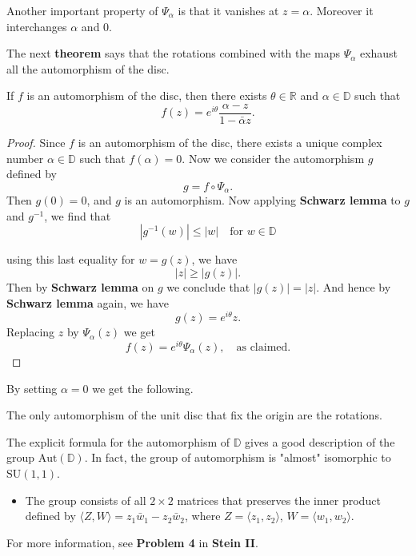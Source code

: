\documentclass{article}
\begin{document}
Another important property of $\Psi_\alpha$ is that it vanishes at $z = \alpha$. Moreover it interchanges $\alpha$ and $0$.

The next \textbf{theorem} says that the rotations combined with the maps $\Psi_\alpha$ exhaust all the automorphism of the disc.

\begin{theorem}
If $f$ is an automorphism of the disc, then there exists $\theta \in \mathbb{R}$ and $\alpha \in \mathbb{D}$ such that
$$f(z) = e^{i\theta} \frac{\alpha - z}{1 - \bar{\alpha} z}.$$
\end{theorem}

\begin{proof}
Since $f$ is an automorphism of the disc, there exists a unique complex number $\alpha \in \mathbb{D}$ such that $f(\alpha) = 0$.
Now we consider the automorphism $g$ defined by
$$g = f \circ \Psi_\alpha.$$
Then $g(0) = 0$, and $g$ is an automorphism.
Now applying \textbf{Schwarz lemma} to $g$ and $g^{-1}$, we find that
$$|g^{-1}(w)| \le |w| \quad \text{for } w \in \mathbb{D}$$

using this last equality for $w = g(z)$, we have
$$|z| \ge |g(z)|.$$
Then by \textbf{Schwarz lemma} on $g$ we conclude that $|g(z)| = |z|$. And hence by \textbf{Schwarz lemma} again, we have
$$g(z) = e^{i\theta} z.$$
Replacing $z$ by $\Psi_\alpha(z)$ we get
$$f(z) = e^{i\theta} \Psi_\alpha(z), \quad \text{as claimed.}$$
\end{proof}

By setting $\alpha = 0$ we get the following.

\begin{corollary}
The only automorphism of the unit disc that fix the origin are the rotations.
\end{corollary}
\begin{remark}
The explicit formula for the automorphism of $\mathbb{D}$ gives a good description of the group $\text{Aut}(\mathbb{D})$. In fact, the group of automorphism is "almost" isomorphic to $\text{SU}(1,1)$.
\begin{itemize}
    \item The group consists of all $2 \times 2$ matrices that preserves the inner product defined by $\langle Z, W \rangle = z_1 \bar{w}_1 - z_2 \bar{w}_2$, where $Z = \langle z_1, z_2 \rangle$, $W = \langle w_1, w_2 \rangle$.
\end{itemize}

For more information, see \textbf{Problem 4} in \textbf{Stein II}.
\end{remark}
\end{document}
